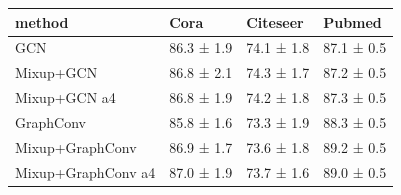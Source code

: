\begin{tabular}{llll}
\toprule
method & Cora & Citeseer & Pubmed \\
\midrule
GCN & 86.3 ± 1.9 & 74.1 ± 1.8 & 87.1 ± 0.5 \\
Mixup+GCN & 86.8 ± 2.1 & 74.3 ± 1.7 & 87.2 ± 0.5 \\
Mixup+GCN a4 & 86.8 ± 1.9 & 74.2 ± 1.8 & 87.3 ± 0.5 \\
GraphConv & 85.8 ± 1.6 & 73.3 ± 1.9 & 88.3 ± 0.5 \\
Mixup+GraphConv & 86.9 ± 1.7 & 73.6 ± 1.8 & 89.2 ± 0.5 \\
Mixup+GraphConv a4 & 87.0 ± 1.9 & 73.7 ± 1.6 & 89.0 ± 0.5 \\
\bottomrule
\end{tabular}
